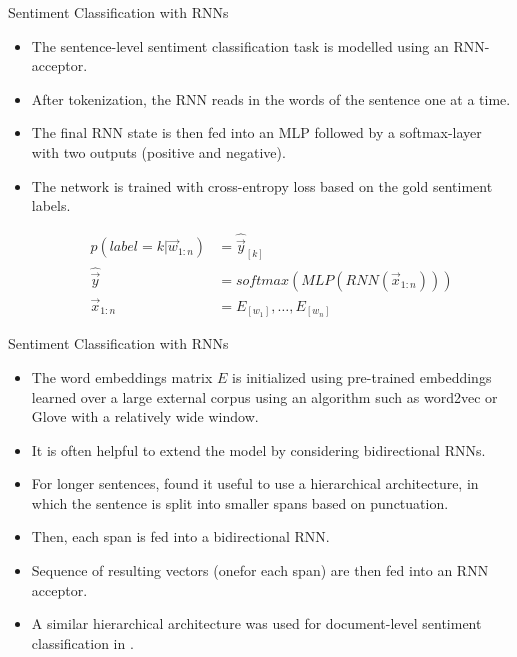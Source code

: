 \documentclass[handout]{beamer}
\begin{document}
\begin{frame}{Sentiment Classification with RNNs}
\begin{scriptsize}
\begin{itemize}
\item The sentence-level sentiment classification task is modelled using an RNN-acceptor.
\item After tokenization, the RNN reads in the words of the sentence one at a time. \item The final RNN state is then fed into an MLP followed by a softmax-layer with two outputs (positive and negative). 
\item The network is trained with cross-entropy loss based on the gold sentiment labels.

\begin{equation}
\begin{split}
p(label = k | \vec{w}_{1:n}) & = \hat{\vec{y}}_{[k]} \\
\hat{\vec{y}} & = softmax(MLP(RNN(\vec{x}_{1:n}))) \\
\vec{x}_{1:n} & = E_{[w_{1}]}, \dots, E_{[w_{n}]} 
\end{split}
\end{equation}

\end{itemize}
\end{scriptsize}
\end{frame}




\begin{frame}{Sentiment Classification with RNNs}
\begin{scriptsize}
\begin{itemize}
\item The word embeddings matrix $E$ is initialized using pre-trained embeddings learned over a large external corpus using an algorithm such as word2vec or Glove with a relatively wide window.
\item It is often helpful to extend the model by considering bidirectional RNNs.
\item For longer sentences, \cite{li2015tree} found it useful to use a hierarchical architecture, in which the sentence is split into smaller spans based on punctuation.
\item Then, each span is fed into a bidirectional RNN. 
\item Sequence of resulting vectors (onefor each span) are then fed into an RNN acceptor.
\item A similar hierarchical architecture was used for document-level sentiment classification in \cite{tang2015document}.
\end{itemize}
\end{scriptsize}
\end{frame}
\end{document}
